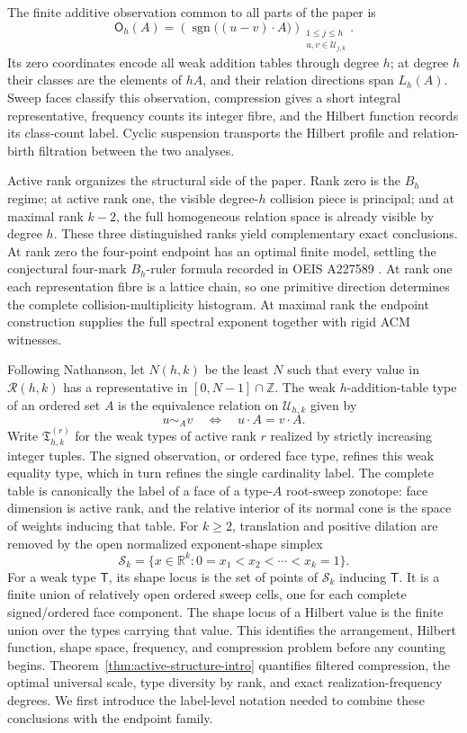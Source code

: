 \documentclass[11pt,reqno]{amsart}
\theoremstyle{definition}
\theoremstyle{remark}
\newcommand{\Rcal}{\mathcal R}
\begin{document}
The finite additive observation common to all parts of the paper is
\[
 \mathsf O_h(A)=
 \left(
  \operatorname{sgn}\bigl((u-v)\cdot A\bigr)
 \right)_{\substack{1\leq j\leq h\\u,v\in\mathcal U_{j,k}}}.
\]
Its zero coordinates encode all weak addition tables through degree $h$; at
degree $h$ their classes are the elements of $hA$, and their relation
directions span $L_h(A)$.  Sweep faces classify this observation, compression
gives a short integral representative, frequency counts its integer fibre,
and the Hilbert function records its class-count label.  Cyclic suspension
transports the Hilbert profile and relation-birth filtration between the two
analyses.

Active rank organizes the structural side of the paper.  Rank zero is the
$B_h$ regime; at active rank one, the visible degree-$h$ collision piece is
principal; and at maximal rank $k-2$, the full homogeneous relation space is
already visible by degree $h$.
These three distinguished ranks yield complementary exact conclusions.  At
rank zero the
four-point endpoint has an optimal finite model, settling the conjectural
four-mark $B_h$-ruler formula recorded in OEIS A227589
\cite{OEISA227589}.  At rank one each
representation fibre
is a lattice chain, so one primitive direction determines the complete
collision-multiplicity histogram.  At maximal rank the endpoint construction
supplies the full spectral exponent together with rigid ACM witnesses.

Following Nathanson, let $N(h,k)$ be the least $N$ such that every value in
$\Rcal(h,k)$ has a representative in $[0,N-1]\cap\mathbb Z$.  The
weak $h$-addition-table type of an ordered set $A$ is the equivalence relation
on $\mathcal U_{h,k}$ given by
\[
 u\sim_A v\quad\Longleftrightarrow\quad u\cdot A=v\cdot A.
\]
 Write $\mathfrak T_{h,k}^{(r)}$ for the weak types of active rank $r$ realized
 by strictly increasing integer tuples.  The signed observation, or ordered
 face type, refines this weak equality type, which in turn refines the single
 cardinality label.  The complete table is canonically the label of a face of a
type-$A$ root-sweep zonotope: face dimension is active rank, and the relative
interior of its normal cone is the space of weights inducing that table.
 For $k\geq2$, translation and positive dilation are removed by the open
 normalized exponent-shape simplex
\[
 \mathcal S_k=\{x\in\mathbb R^k:0=x_1<x_2<\cdots<x_k=1\}.
\]
For a weak type $\mathsf T$, its shape locus is the set of points of
$\mathcal S_k$ inducing $\mathsf T$.  It is a finite union of relatively open
ordered sweep cells, one for each complete signed/ordered face component.
The shape locus of a Hilbert value is the finite union over the types carrying
that value.
This identifies the arrangement, Hilbert function, shape space, frequency,
and compression problem before any counting begins.
Theorem~\ref{thm:active-structure-intro} quantifies filtered compression, the
optimal universal scale, type diversity by rank, and exact
realization-frequency degrees.  We first introduce the label-level notation
needed to combine these conclusions with the endpoint family.
\end{document}
